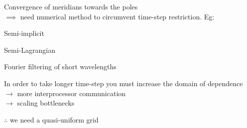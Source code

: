 \begin{slide}
\pauseHS

\begin{list0}
\item Convergence of meridians towards the poles\pauseHS\\
    $\implies$ need numerical method to circumvent time-step restriction. Eg:
    \begin{list1}
    \item Semi-implicit
    \item Semi-Lagrangian
    \item Fourier filtering of short wavelengths\pauseHS
    \end{list1}
    
\item In order to take longer time-step you must increase the domain of dependence\\
    $\rightarrow$ more interprocessor communication\\
    $\rightarrow$ scaling bottlenecks\pauseHS

\item $\therefore$ we need a quasi-uniform grid
\end{list0}

\end{slide}
